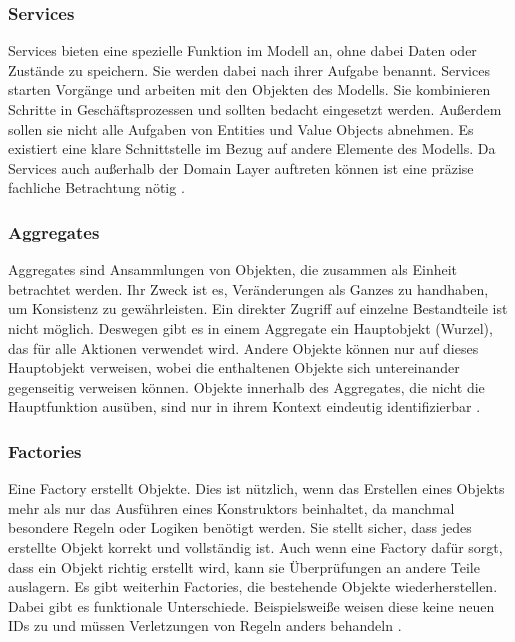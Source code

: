 {\subsubsection{Services}

\glqq Services\grqq{} bieten eine spezielle Funktion im Modell an, ohne dabei Daten oder Zustände zu speichern. Sie werden dabei nach ihrer Aufgabe benannt. Services starten Vorgänge und arbeiten mit den Objekten des Modells. Sie kombinieren Schritte in Geschäftsprozessen und sollten bedacht eingesetzt werden. Außerdem sollen sie nicht alle Aufgaben von Entities und Value Objects abnehmen. Es existiert eine klare Schnittstelle im Bezug auf andere Elemente des Modells. Da Services auch außerhalb der Domain Layer auftreten können ist eine präzise fachliche Betrachtung nötig \cite[S. 104 - 108]{evans} \cite[S.74]{daschner}.

\subsubsection{Aggregates}

\glqq Aggregates\grqq{} sind Ansammlungen von Objekten, die zusammen als Einheit betrachtet werden. Ihr Zweck ist es, Veränderungen als Ganzes zu handhaben, um Konsistenz zu gewährleisten. Ein direkter Zugriff auf einzelne Bestandteile ist nicht möglich. Deswegen gibt es in einem Aggregate ein Hauptobjekt (Wurzel), das für alle Aktionen verwendet wird. Andere Objekte können nur auf dieses Hauptobjekt verweisen, wobei die enthaltenen Objekte sich untereinander gegenseitig verweisen können. Objekte innerhalb des Aggregates, die nicht die Hauptfunktion ausüben, sind nur in ihrem Kontext eindeutig identifizierbar \cite[S. 123 - 135]{evans} \cite[S.76]{daschner}.

\subsubsection{Factories}

Eine \glqq Factory\grqq{} erstellt Objekte. Dies ist nützlich, wenn das Erstellen eines Objekts mehr als nur das Ausführen eines Konstruktors beinhaltet, da manchmal besondere Regeln oder Logiken benötigt werden. Sie stellt sicher, dass jedes erstellte Objekt korrekt und vollständig ist. Auch wenn eine Factory dafür sorgt, dass ein Objekt richtig erstellt wird, kann sie Überprüfungen an andere Teile auslagern. Es gibt weiterhin Factories, die bestehende Objekte wiederherstellen. Dabei gibt es funktionale Unterschiede. Beispielsweiße weisen diese keine neuen IDs zu und müssen Verletzungen von Regeln anders behandeln \cite[S. 136 - 146]{evans} \cite[S.77]{daschner}.

}
